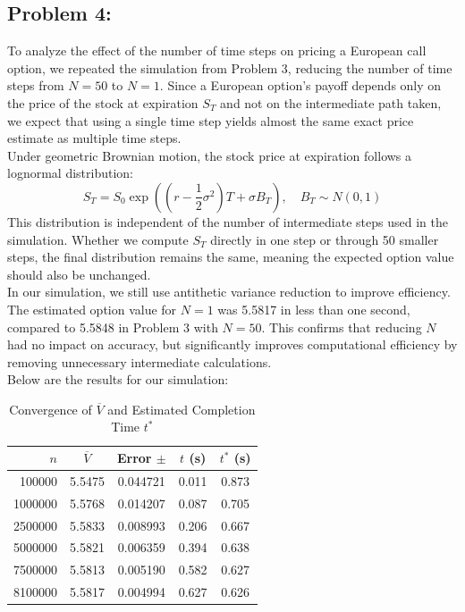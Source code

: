 \documentclass{report}
\begin{document}
\newpage
\subsection*{Problem 4:}
To analyze the effect of the number of time steps on pricing a European call option, we repeated the simulation from Problem 3, reducing the number of time steps from $N = 50$ to $N = 1$. Since a European option's payoff depends only on the price of the stock at expiration $S_T$ and not on the intermediate path taken, we expect that using a single time step yields almost the same exact price estimate as multiple time steps. \\

Under geometric Brownian motion, the stock price at expiration follows a lognormal distribution:
\[
S_T = S_0 \exp((r-\frac{1}{2}\sigma^2)T+\sigma B_T), \quad B_T \sim N(0, 1)
\]
This distribution is independent of the number of intermediate steps used in the simulation. Whether we compute $S_T$ directly in one step or through 50 smaller steps, the final distribution remains the same, meaning the expected option value should also be unchanged. \\

In our simulation, we still use antithetic variance reduction to improve efficiency. The estimated option value for $N = 1$ was 5.5817 in less than one second, compared to 5.5848 in Problem 3 with $N = 50$. This confirms that reducing $N$ had no impact on accuracy, but significantly improves computational efficiency by removing unnecessary intermediate calculations. \\

Below are the results for our simulation:

\begin{table}[H]
    \centering
    \caption{Convergence of $\overline{V}$ and Estimated Completion Time $t^*$}
    \label{tab:simulation_results}
    \begin{tabular}{rcccc}
        \hline
        $n$ & $\overline{V}$ & Error $\pm$ & $t$ (s) & $t^*$ (s) \\
        \hline
        100000  & 5.5475 & 0.044721 & 0.011 & 0.873 \\ 
        1000000 & 5.5768 & 0.014207 & 0.087 & 0.705 \\
        2500000 & 5.5833 & 0.008993 & 0.206 & 0.667 \\
        5000000 & 5.5821 & 0.006359 & 0.394 & 0.638 \\
        7500000 & 5.5813 & 0.005190 & 0.582 & 0.627 \\
        8100000 & 5.5817 & 0.004994 & 0.627 & 0.626 \\
        \hline
    \end{tabular}
\end{table}
\end{document}
